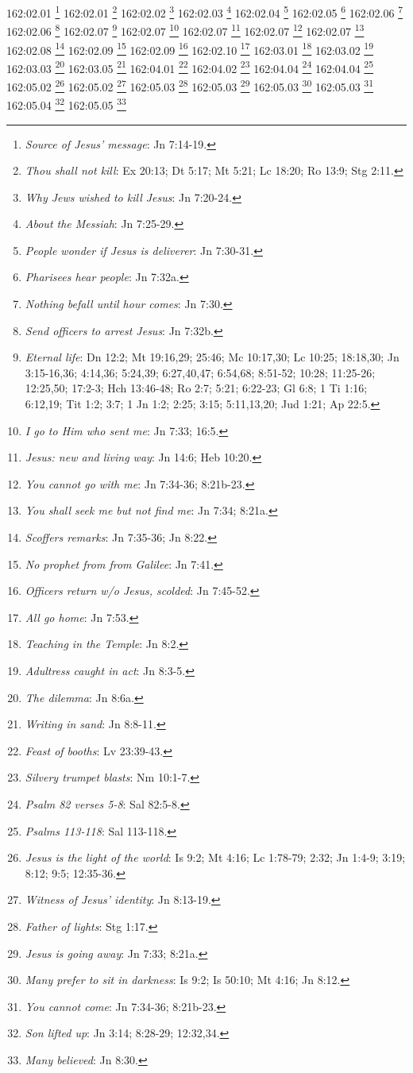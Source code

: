 162:02.01 \footnote{\textit{Source of Jesus' message}: Jn 7:14-19.}
162:02.01 \footnote{\textit{Thou shall not kill}: Ex 20:13; Dt 5:17; Mt 5:21; Lc 18:20; Ro 13:9; Stg 2:11.}
162:02.02 \footnote{\textit{Why Jews wished to kill Jesus}: Jn 7:20-24.}
162:02.03 \footnote{\textit{About the Messiah}: Jn 7:25-29.}
162:02.04 \footnote{\textit{People wonder if Jesus is deliverer}: Jn 7:30-31.}
162:02.05 \footnote{\textit{Pharisees hear people}: Jn 7:32a.}
162:02.06 \footnote{\textit{Nothing befall until hour comes}: Jn 7:30.}
162:02.06 \footnote{\textit{Send officers to arrest Jesus}: Jn 7:32b.}
162:02.07 \footnote{\textit{Eternal life}: Dn 12:2; Mt 19:16,29; 25:46; Mc 10:17,30; Lc 10:25; 18:18,30; Jn 3:15-16,36; 4:14,36; 5:24,39; 6:27,40,47; 6:54,68; 8:51-52; 10:28; 11:25-26; 12:25,50; 17:2-3; Hch 13:46-48; Ro 2:7; 5:21; 6:22-23; Gl 6:8; 1 Ti 1:16; 6:12,19; Tit 1:2; 3:7; 1 Jn 1:2; 2:25; 3:15; 5:11,13,20; Jud 1:21; Ap 22:5.}
162:02.07 \footnote{\textit{I go to Him who sent me}: Jn 7:33; 16:5.}
162:02.07 \footnote{\textit{Jesus: new and living way}: Jn 14:6; Heb 10:20.}
162:02.07 \footnote{\textit{You cannot go with me}: Jn 7:34-36; 8:21b-23.}
162:02.07 \footnote{\textit{You shall seek me but not find me}: Jn 7:34; 8:21a.}
162:02.08 \footnote{\textit{Scoffers remarks}: Jn 7:35-36; Jn 8:22.}
162:02.09 \footnote{\textit{No prophet from from Galilee}: Jn 7:41.}
162:02.09 \footnote{\textit{Officers return w/o Jesus, scolded}: Jn 7:45-52.}
162:02.10 \footnote{\textit{All go home}: Jn 7:53.}
162:03.01 \footnote{\textit{Teaching in the Temple}: Jn 8:2.}
162:03.02 \footnote{\textit{Adultress caught in act}: Jn 8:3-5.}
162:03.03 \footnote{\textit{The dilemma}: Jn 8:6a.}
162:03.05 \footnote{\textit{Writing in sand}: Jn 8:8-11.}
162:04.01 \footnote{\textit{Feast of booths}: Lv 23:39-43.}
162:04.02 \footnote{\textit{Silvery trumpet blasts}: Nm 10:1-7.}
162:04.04 \footnote{\textit{Psalm 82 verses 5-8}: Sal 82:5-8.}
162:04.04 \footnote{\textit{Psalms 113-118}: Sal 113-118.}
162:05.02 \footnote{\textit{Jesus is the light of the world}: Is 9:2; Mt 4:16; Lc 1:78-79; 2:32; Jn 1:4-9; 3:19; 8:12; 9:5; 12:35-36.}
162:05.02 \footnote{\textit{Witness of Jesus' identity}: Jn 8:13-19.}
162:05.03 \footnote{\textit{Father of lights}: Stg 1:17.}
162:05.03 \footnote{\textit{Jesus is going away}: Jn 7:33; 8:21a.}
162:05.03 \footnote{\textit{Many prefer to sit in darkness}: Is 9:2; Is 50:10; Mt 4:16; Jn 8:12.}
162:05.03 \footnote{\textit{You cannot come}: Jn 7:34-36; 8:21b-23.}
162:05.04 \footnote{\textit{Son lifted up}: Jn 3:14; 8:28-29; 12:32,34.}
162:05.05 \footnote{\textit{Many believed}: Jn 8:30.}
